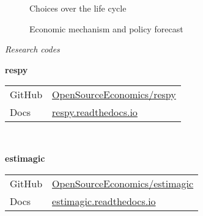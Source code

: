 \begin{frame}
  \begin{figure}
  \caption{Choices over the life cycle}\label{Choices over the life cycle}
  \end{figure}
\end{frame}
\begin{frame}
  \begin{figure}[h!]\centering
  \caption{Economic mechanism and policy forecast}\label{Economic mechanism and policy forecast}
  \hspace{0.3cm}
  \end{figure}
\end{frame}
\begin{frame}\begin{center}
  \Large\textit{Research codes}
\end{center}\end{frame}
\begin{frame}
\textbf{respy}\\\vspace{0.3cm}
\begin{tabular}{ll}
GitHub  & \url{OpenSourceEconomics/respy}\\
Docs    & \url{respy.readthedocs.io}\\
\end{tabular}\\\vspace{1cm}

\textbf{estimagic}\\\vspace{0.3cm}
\begin{tabular}{ll}
GitHub	& \url{OpenSourceEconomics/estimagic}\\
Docs    & \url{estimagic.readthedocs.io}\\
\end{tabular}

\end{frame}
